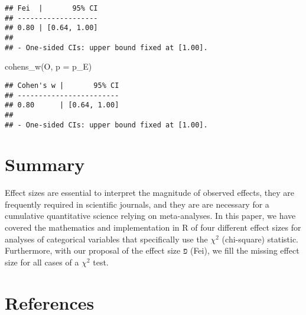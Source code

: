 \documentclass[
]{article}
\newenvironment{Shaded}{\begin{snugshade}}{\end{snugshade}}
\newcommand{\AttributeTok}[1]{\textcolor[rgb]{0.77,0.63,0.00}{#1}}
\newcommand{\FunctionTok}[1]{\textcolor[rgb]{0.00,0.00,0.00}{#1}}
\newcommand{\NormalTok}[1]{#1}
\begin{document}
\begin{verbatim}
## Fei  |       95% CI
## -------------------
## 0.80 | [0.64, 1.00]
## 
## - One-sided CIs: upper bound fixed at [1.00].
\end{verbatim}

\begin{Shaded}
\begin{Highlighting}[]
\FunctionTok{cohens\_w}\NormalTok{(O, }\AttributeTok{p =}\NormalTok{ p\_E)}
\end{Highlighting}
\end{Shaded}

\begin{verbatim}
## Cohen's w |       95% CI
## ------------------------
## 0.80      | [0.64, 1.00]
## 
## - One-sided CIs: upper bound fixed at [1.00].
\end{verbatim}

\hypertarget{summary}{%
\section{Summary}\label{summary}}

Effect sizes are essential to interpret the magnitude of observed
effects, they are frequently required in scientific journals, and they
are are necessary for a cumulative quantitative science relying on
meta-analyses. In this paper, we have covered the mathematics and
implementation in R of four different effect sizes for analyses of
categorical variables that specifically use the \(\chi^2\) (chi-square)
statistic. Furthermore, with our proposal of the effect size פ (Fei), we
fill the missing effect size for all cases of a \(\chi^2\) test.

\hypertarget{references}{%
\section*{References}\label{references}}
\end{document}
